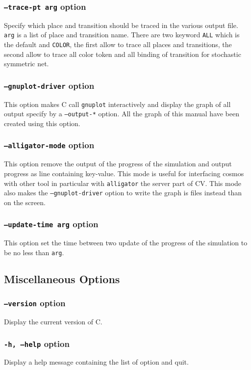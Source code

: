 \documentclass{article}
\newcommand{\cosmos}{\mbox{\textup{C}\scalebox{0.75}{{\textsc{OSMOS}}}}}
\newcommand{\cosyverif}{\mbox{\textup{C}\scalebox{0.75}{{\textsc{OSY}}}\textup{V}\scalebox{0.75}{{\textsc{ERIF}}}}}
\begin{document}
\subsubsection{\texttt{--trace-pt arg} option}
Specify which place and transition should be traced in the various
output file.  \texttt{arg} is a list of place and transition
name. There are two keyword \texttt{ALL} which is the default and
\texttt{COLOR}, the first allow to trace all places and transitions,
the second allow to trace all color token and all binding of
transition for stochastic symmetric net.

\subsubsection{\texttt{--gnuplot-driver} option}
This option makes \cosmos{} call \texttt{gnuplot} interactively and
display the graph of all output specify by a \texttt{--output-*}
option.  All the graph of this manual have been created using this
option.

\subsubsection{\texttt{--alligator-mode} option}
This option remove the output of the progress of the simulation 
and output progress as line containing key-value. This mode
is useful for interfacing cosmos with other tool in particular 
with \texttt{alligator} the server part of \cosyverif. This 
mode also makes the \texttt{--gnuplot-driver} option to write
the graph is files instead than on the screen.

\subsubsection{\texttt{--update-time arg} option}
This option set the time between two update of the progress of the simulation
to be no less than \texttt{arg}.

\subsection{Miscellaneous Options}
\subsubsection{\texttt{--version} option}
Display the current version of \cosmos{}.

\subsubsection{\texttt{-h, --help} option}
Display a help message containing the list of option and quit.
\end{document}
